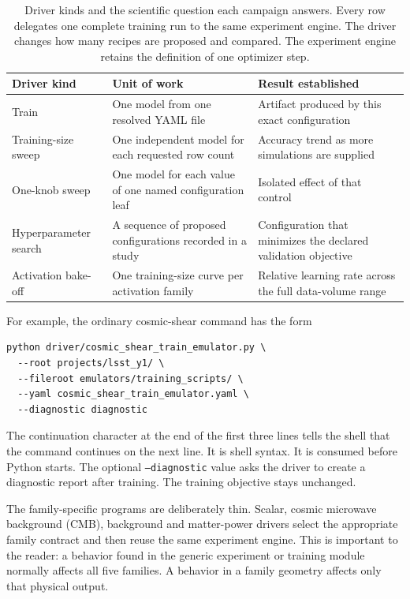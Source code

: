 \documentclass[10pt,aps,prd,twocolumn,nofootinbib]{revtex4-2}
\newcommand{\code}[1]{\texttt{#1}}
\begin{document}
\begin{table}[t]
\centering
\begin{tabular}{p{}p{}p{}}
\toprule
Driver kind & Unit of work & Result established \\
\midrule
Train & One model from one resolved YAML file & Artifact produced by this exact
configuration \\
Training-size sweep & One independent model for each requested row count &
Accuracy trend as more simulations are supplied \\
One-knob sweep & One model for each value of one named configuration leaf &
Isolated effect of that control \\
Hyperparameter search & A sequence of proposed configurations recorded in a
study & Configuration that minimizes the declared validation objective \\
Activation bake-off & One training-size curve per activation family & Relative
learning rate across the full data-volume range \\
\bottomrule
\end{tabular}
\caption{Driver kinds and the scientific question each campaign answers.
Every row delegates one complete training run to the same experiment engine.
The driver changes how many recipes are proposed and compared.  The experiment
engine retains the definition of one optimizer step.}
\label{tab:driver-kinds}
\end{table}

For example, the ordinary cosmic-shear command has the form
\begin{verbatim}
python driver/cosmic_shear_train_emulator.py \
  --root projects/lsst_y1/ \
  --fileroot emulators/training_scripts/ \
  --yaml cosmic_shear_train_emulator.yaml \
  --diagnostic diagnostic
\end{verbatim}
The continuation character at the end of the first three lines tells the
shell that the command continues on the next line.  It is shell syntax.  It is
consumed before Python starts.  The optional \code{--diagnostic} value asks the driver
to create a diagnostic report after training.  The training objective stays
unchanged.

The family-specific programs are deliberately thin.  Scalar, cosmic
microwave background (CMB),
background and matter-power drivers select the appropriate family contract
and then reuse the same experiment engine.  This is important to the reader:
a behavior found in the generic experiment or training module normally
affects all five families.  A behavior in a family geometry affects only that
physical output.
\end{document}
